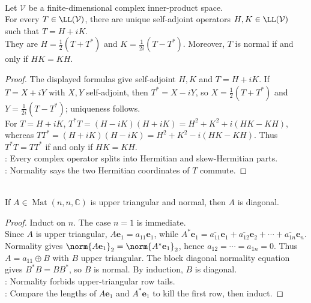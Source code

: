 \begin{proposition} \label{prop:cartesian-decomposition-normal-commuting-parts} \\
Let $\mathcal{V}$ be a finite-dimensional complex inner-product space.\\
For every $T\in\LL(\mathcal{V})$, there are unique self-adjoint operators $H,K\in\LL(\mathcal{V})$ such that $T=H+iK$.\\
They are $H=\frac{1}{2}(T+T^*)$ and $K=\frac{1}{2i}(T-T^*)$. Moreover, $T$ is normal if and only if $HK=KH$.
\begin{proof}
The displayed formulas give self-adjoint $H,K$ and $T=H+iK$. If $T=X+iY$ with $X,Y$ self-adjoint, then $T^*=X-iY$, so $X=\frac{1}{2}(T+T^*)$ and $Y=\frac{1}{2i}(T-T^*)$; uniqueness follows.\\
For $T=H+iK$, $T^*T=(H-iK)(H+iK)=H^2+K^2+i(HK-KH)$,\\
whereas $TT^*=(H+iK)(H-iK)=H^2+K^2-i(HK-KH)$. Thus $T^*T=TT^*$ if and only if $HK=KH$.\\
: Every complex operator splits into Hermitian and skew-Hermitian parts.\\
: Normality says the two Hermitian coordinates of $T$ commute.
\end{proof}
\end{proposition}

\begin{lemma} \label{lem:upper-triangular-normal-matrix-is-diagonal} \\
If $A\in\operatorname{Mat}(n,n,\mathbb{C})$ is upper triangular and normal, then $A$ is diagonal.
\begin{proof}
Induct on $n$. The case $n=1$ is immediate.\\
Since $A$ is upper triangular, $A\mathbf{e}_1=a_{11}\mathbf{e}_1$, while $A^*\mathbf{e}_1=\overline{a_{11}}\mathbf{e}_1+\overline{a_{12}}\mathbf{e}_2+\cdots+\overline{a_{1n}}\mathbf{e}_n$.\\
Normality gives $\norm{A\mathbf{e}_1}_2=\norm{A^*\mathbf{e}_1}_2$, hence $a_{12}=\cdots=a_{1n}=0$. Thus $A=a_{11}\oplus B$ with $B$ upper triangular. The block diagonal normality equation gives $B^*B=BB^*$, so $B$ is normal. By induction, $B$ is diagonal.\\
: Normality forbids upper-triangular row tails.\\
: Compare the lengths of $A\mathbf{e}_1$ and $A^*\mathbf{e}_1$ to kill the first row, then induct.
\end{proof}
\end{lemma}

